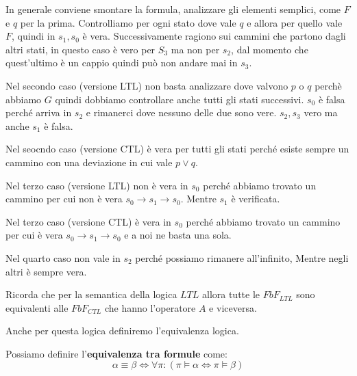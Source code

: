 \begin{esempio} 
    
    In generale conviene smontare la formula, analizzare gli elementi semplici, 
    come $F$ e $q$ per la prima. Controlliamo per ogni stato dove vale $q$ e allora
    per quello vale $F$, quindi in $s_1, s_0$ è vera. Successivamente ragiono
    sui cammini che partono dagli altri stati, in questo caso è vero per $S_3$ ma
    non per $s_2$, dal momento che quest'ultimo è un cappio quindi può non andare
    mai in $s_3$.

    Nel secondo caso (versione LTL) non basta analizzare dove valvono $p$ o $q$ perchè abbiamo $G$
    quindi dobbiamo controllare anche tutti gli stati successivi. $s_0$ è falsa
    perché arriva in $s_2$ e rimanerci dove nessuno delle due sono vere. $s_2,s_3$
    vero ma anche $s_1$ è falsa.

    Nel seocndo caso (versione CTL) è vera per tutti gli stati perché esiste sempre
    un cammino con una deviazione in cui vale $p\lor q$.
    
    Nel terzo caso (versione LTL) non è vera in $s_0$ perché abbiamo trovato un cammino per cui
    non è vera $s_0\to s_1\to s_0$. Mentre $s_1$ è verificata.

    Nel terzo caso (versione CTL) è vera in $s_0$ perché abbiamo trovato un cammino per cui
    è vera $s_0\to s_1\to s_0$ e a noi ne basta una sola.

    Nel quarto caso non vale in $s_2$ perché possiamo rimanere all'infinito, Mentre
    negli altri è sempre vera.
\end{esempio}

\begin{nota}
    Ricorda che per la semantica della logica $LTL$ allora tutte le $FbF_{LTL}$
    sono equivalenti alle $FbF_{CTL}$ che hanno l'operatore $A$ e viceversa.
\end{nota}

Anche per questa logica definiremo l'equivalenza logica.
\begin{definizione}
    Possiamo definire l'\textbf{equivalenza tra formule} come:
    \begin{equation}
        \alpha \equiv \beta \iff \forall \pi : ( \pi \vDash \alpha \iff \pi \vDash 
        \beta)
    \end{equation}
\end{definizione}

